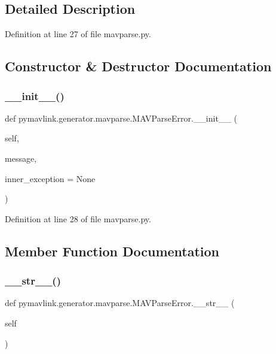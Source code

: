 \subsection{Detailed Description}


Definition at line 27 of file mavparse.\+py.



\subsection{Constructor \& Destructor Documentation}
\mbox{\label{classpymavlink_1_1generator_1_1mavparse_1_1MAVParseError_aa1e76d16c6c42f278bc0373374c4f90e}} 
\subsubsection{\texorpdfstring{\_\_init\_\_()}{\_\_init\_\_()}}
{\footnotesize\ttfamily def pymavlink.\+generator.\+mavparse.\+M\+A\+V\+Parse\+Error.\+\_\+\+\_\+init\+\_\+\+\_\+ (\begin{DoxyParamCaption}\item[{}]{self,  }\item[{}]{message,  }\item[{}]{inner\+\_\+exception = {\ttfamily None} }\end{DoxyParamCaption})}



Definition at line 28 of file mavparse.\+py.



\subsection{Member Function Documentation}
\mbox{\label{classpymavlink_1_1generator_1_1mavparse_1_1MAVParseError_a92f1e0272ecee341be18ab9abc3e46e0}} 
\subsubsection{\texorpdfstring{\_\_str\_\_()}{\_\_str\_\_()}}
{\footnotesize\ttfamily def pymavlink.\+generator.\+mavparse.\+M\+A\+V\+Parse\+Error.\+\_\+\+\_\+str\+\_\+\+\_\+ (\begin{DoxyParamCaption}\item[{}]{self }\end{DoxyParamCaption})}



